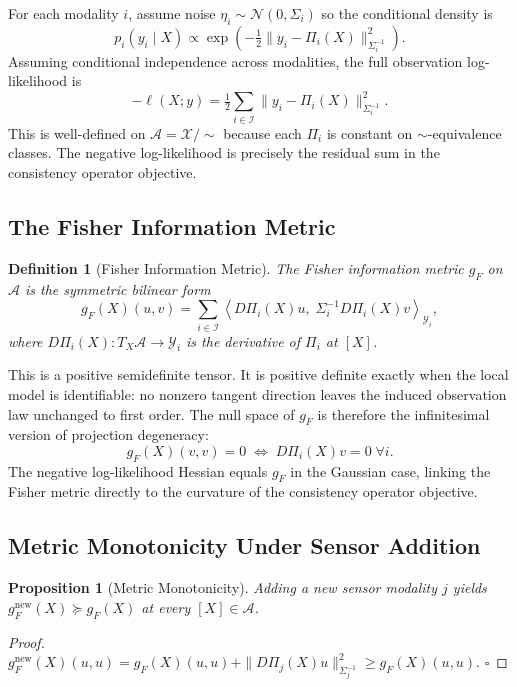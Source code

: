 \documentclass[12pt, oneside]{article}
\newtheorem{proposition}[theorem]{Proposition}
\newtheorem{definition}[theorem]{Definition}
\newcommand{\Xmod}{\mathcal{X}/{\sim}}
\begin{document}
For each modality $i$, assume noise $\eta_i \sim \mathcal{N}(0, \Sigma_i)$ so the
conditional density is
\[
p_i(y_i \mid X) \propto \exp\!\left(
-\tfrac{1}{2}\|y_i - \Pi_i(X)\|_{\Sigma_i^{-1}}^2
\right).
\]
Assuming conditional independence across modalities, the full observation log-likelihood is
\[
-\ell(X; y) = \tfrac{1}{2}\sum_{i \in \mathcal{I}} \|y_i - \Pi_i(X)\|_{\Sigma_i^{-1}}^2.
\]
This is well-defined on $\mathcal{A} = \Xmod$ because each $\Pi_i$ is constant on
$\sim$-equivalence classes. The negative log-likelihood is precisely the residual sum
in the consistency operator objective.

\subsection{The Fisher Information Metric}

\begin{definition}[Fisher Information Metric]
The Fisher information metric $g_F$ on $\mathcal{A}$ is the symmetric bilinear form
\[
g_F(X)(u, v) = \sum_{i \in \mathcal{I}}
\left\langle D\Pi_i(X)u,\; \Sigma_i^{-1} D\Pi_i(X)v \right\rangle_{\mathcal{Y}_i},
\]
where $D\Pi_i(X) : T_X\mathcal{A} \to \mathcal{Y}_i$ is the derivative of $\Pi_i$ at $[X]$.
\end{definition}

This is a positive semidefinite tensor. It is positive definite exactly when the local
model is identifiable: no nonzero tangent direction leaves the induced observation law
unchanged to first order. The null space of $g_F$ is therefore the infinitesimal version
of projection degeneracy:
\[
g_F(X)(v,v) = 0 \;\Longleftrightarrow\; D\Pi_i(X)v = 0 \;\forall i.
\]
The negative log-likelihood Hessian equals $g_F$ in the Gaussian case, linking the
Fisher metric directly to the curvature of the consistency operator objective.

\subsection{Metric Monotonicity Under Sensor Addition}

\begin{proposition}[Metric Monotonicity]
\label{prop:metric_monotone}
Adding a new sensor modality $j$ yields
$g_F^{\mathrm{new}}(X) \succeq g_F(X)$ at every $[X] \in \mathcal{A}$.
\end{proposition}
\begin{proof}
$g_F^{\mathrm{new}}(X)(u,u) = g_F(X)(u,u) +
\|D\Pi_j(X)u\|_{\Sigma_j^{-1}}^2 \ge g_F(X)(u,u)$.
$\square$
\end{proof}
\end{document}
